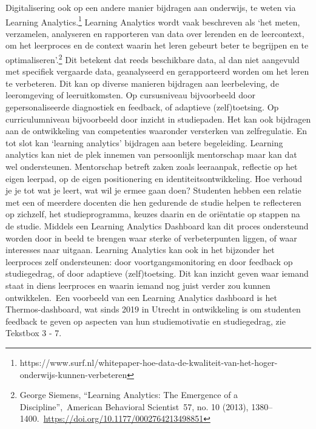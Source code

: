 \documentclass{jote-book}
\begin{document}
	Digitalisering ook op een andere manier bijdragen aan onderwijs, te weten via Learning Analytics.\footnote{https://www.surf.nl/whitepaper-hoe-data-de-kwaliteit-van-het-hoger-onderwijs-kunnen-verbeteren} Learning Analytics wordt vaak beschreven als ‘het meten, verzamelen, analyseren en rapporteren van data over lerenden en de leercontext, om het leerproces en de context waarin het leren gebeurt beter te begrijpen en te optimaliseren'.\footnote{George Siemens, “Learning Analytics: The Emergence of a Discipline”, American Behavioral Scientist 57, no. 10 (2013), 1380--1400. \href{https://doi.org/10.1177/0002764213498851}{https://doi.org/10.1177/0002764213498851}} Dit betekent dat reeds beschikbare data, al dan niet aangevuld met specifiek vergaarde data, geanalyseerd en gerapporteerd worden om het leren te verbeteren. Dit kan op diverse manieren bijdragen aan leerbeleving, de leeromgeving of leeruitkomsten. Op cursusniveau bijvoorbeeld door gepersonaliseerde diagnostiek en feedback, of adaptieve (zelf)toetsing. Op curriculumniveau bijvoorbeeld door inzicht in studiepaden. Het kan ook bijdragen aan de ontwikkeling van competenties waaronder versterken van zelfregulatie. En tot slot kan ‘learning analytics' bijdragen aan betere begeleiding. Learning analytics kan niet de plek innemen van persoonlijk mentorschap maar kan dat wel ondersteunen. Mentorschap betreft zaken zoals leeraanpak, reflectie op het eigen leerpad, op de eigen positionering en identiteitsontwikkeling. Hoe verhoud je je tot wat je leert, wat wil je ermee gaan doen? Studenten hebben een relatie met een of meerdere docenten die hen gedurende de studie helpen te reflecteren op zichzelf, het studieprogramma, keuzes daarin en de oriëntatie op stappen na de studie. Middels een Learning Analytics Dashboard kan dit proces ondersteund worden door in beeld te brengen waar sterke of verbeterpunten liggen, of waar interesses naar uitgaan. Learning Analytics kan ook in het bijzonder het leerproces zelf ondersteunen: door voortgangsmonitoring en door feedback op studiegedrag, of door adaptieve (zelf)toetsing. Dit kan inzicht geven waar iemand staat in diens leerproces en waarin iemand nog juist verder zou kunnen ontwikkelen. Een voorbeeld van een Learning Analytics dashboard is het Thermos-dashboard, wat sinds 2019 in Utrecht in ontwikkeling is om studenten feedback te geven op aspecten van hun studiemotivatie en studiegedrag, zie Tekstbox 3 - 7.
\end{document}
